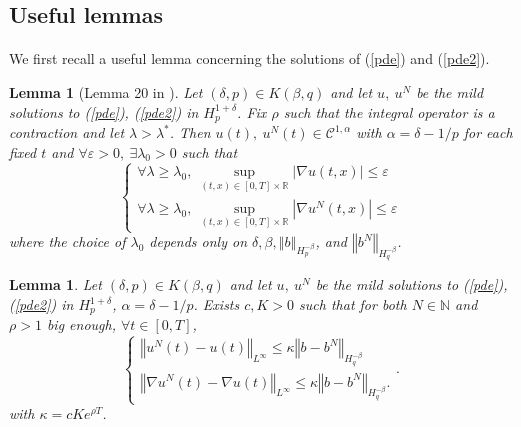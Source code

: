 \documentclass[11pt]{enstaPRE}
\newtheorem{lem}[theo]{Lemma}
\newcommand{\norme}[1]{\left\Vert #1\right\Vert}
\newcommand{\R}{\mathbb{R}}
\newcommand{\N}{\mathbb{N}}
\begin{document}
\subsection{Useful lemmas}

\paragraph{}              
We first recall a useful lemma concerning the solutions of (\ref{pde}) and (\ref{pde2}).

\begin{lem}[Lemma 20 in \cite{Fla-Iss-Rus-2017}]\label{lem}
    Let $(\delta,p)\in K(\beta,q)$ and let $u,\ u^N$ be the mild solutions to (\ref{pde}), (\ref{pde2}) in $H_p^{1+\delta}$. Fix $\rho$ such that the integral operator is a contraction and let $\lambda>\lambda^*$. Then $u(t),\ u^N(t)\in\mathcal{C}^{1,\alpha}$ with $\alpha=\delta-1/p$ for each fixed $t$ and $\forall\varepsilon>0,\ \exists\lambda_0>0$ such that
    \begin{equation*}
    \begin{cases}\forall\lambda\geq\lambda_0,\
    \underset{(t,x)\in[0,T]\times\R}{\sup} |\nabla u(t,x)| \leq\varepsilon  \\ \forall\lambda\geq\lambda_0,\
    \underset{(t,x)\in[0,T]\times\R}{\sup} |\nabla u^N(t,x)| \leq\varepsilon
    \end{cases}
    \end{equation*}
    where the choice of $\lambda_0$ depends only on $\delta,\beta,\norme{b}_{H_p^{-\beta}}$, and $\norme{b^N}_{H_q^{-\beta}}$.
\end{lem}

\begin{lem}\label{morrey} Let $(\delta,p)\in K(\beta,q)$ and let $u,\ u^N$ be the mild solutions to (\ref{pde}),(\ref{pde2}) in $H_p^{1+\delta}$, $\alpha = \delta - 1/p$. Exists $c,K>0$ such that for both $N\in\N$ and $\rho>1$ big enough, $\forall t\in[0,T]$,
    \begin{equation}
    \begin{cases}
    \norme{u^N(t) - u(t)}_{L^\infty}\leq \kappa\norme{b-b^N}_{H^{-\beta}_{q}}\\        
    \norme{\nabla u^N(t) - \nabla u(t)}_{L^\infty}\leq \kappa \norme{b-b^N}_{H^{-\beta}_{q}}.
    \end{cases} .
    \end{equation}
    with $\kappa = c Ke^{\rho T}$.
\end{lem}    
\end{document}
